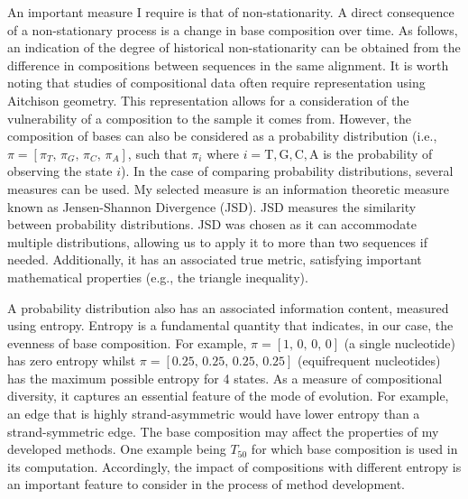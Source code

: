 An important measure I require is that of non-stationarity. A direct consequence of a non-stationary process is a change in base composition over time. As follows, an indication of the degree of historical non-stationarity can be obtained from the difference in compositions between sequences in the same alignment. It is worth noting that studies of compositional data often require representation using Aitchison geometry. This representation allows for a consideration of the vulnerability of a composition to the sample it comes from. However, the composition of bases can also be considered as a probability distribution (i.e., $\pi = [\pi_T,\, \pi_G, \, \pi_C, \, \pi_A]$, such that $\pi_i$ where $i= \mathrm{T}, \mathrm{G}, \mathrm{C}, \mathrm{A}$ is the probability of observing the state $i$). In the case of comparing probability distributions, several measures can be used. My selected measure is an information theoretic measure known as Jensen-Shannon Divergence (JSD). JSD measures the similarity between probability distributions. JSD was chosen as it can accommodate multiple distributions, allowing us to apply it to more than two sequences if needed. Additionally, it has an associated true metric, satisfying important mathematical properties (e.g., the triangle inequality). 

A probability distribution also has an associated information content, measured using entropy. Entropy is a fundamental quantity that indicates, in our case, the evenness of base composition. For example, $\pi =[1,\, 0,\, 0,\, 0]$  (a single nucleotide) has zero entropy whilst  $\pi =[0.25,\, 0.25,\, 0.25,\, 0.25]$ (equifrequent nucleotides) has the maximum possible entropy for 4 states. As a measure of compositional diversity, it captures an essential feature of the mode of evolution. For example, an edge that is highly \gls{strand-asymmetric} would have lower entropy than a \gls{strand-symmetric} edge. The base composition may affect the properties of my developed methods. One example being $T_{50}$ for which base composition is used in its computation. Accordingly, the impact of compositions with different entropy is an important feature to consider in the process of method development.

